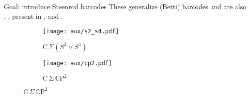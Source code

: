 
\begin{frame}{Goal: introduce Steenrod barcodes}
	\pause
	These generalize (Betti) barcodes and are also
	\pause
	,
	\pause
	,
	\pause
	present in ,
	\pause
	and .

	\pause\medskip
	\vskip-15pt
	\begin{figure}
		\centering
		\begin{subfigure}[b]{0.49\textwidth}
			\centering
			\texttt{[image: aux/s2\_s4.pdf]}
			\caption{$\mathrm C\,\Sigma(S^2 \vee S^4)$}
			\label{f:s2_s4}
		\end{subfigure}
		\pause
		\begin{subfigure}[b]{0.49\textwidth}
			\centering
			\texttt{[image: aux/cp2.pdf]}
			\caption{$\mathrm C\,\Sigma\,\mathbb C \mathrm P^2$}
			\label{f:cp2}
		\end{subfigure}
	\end{figure}
\end{frame}